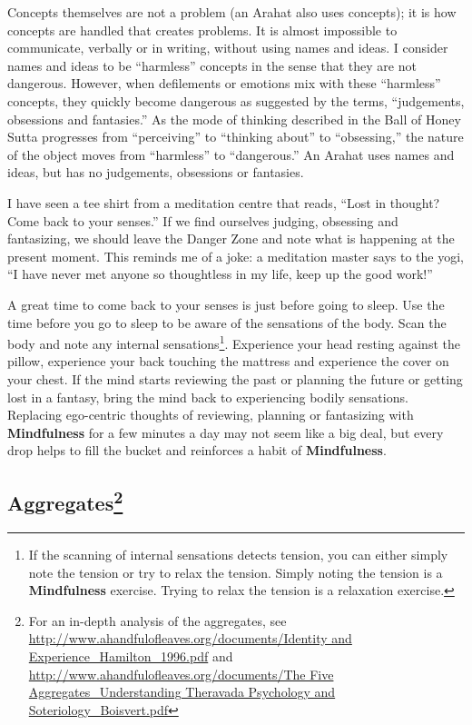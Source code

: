 Concepts themselves are not a problem (an Arahat also uses concepts); it is how concepts are handled that creates problems. It is almost impossible to communicate, verbally or in writing, without using names and ideas. I consider names and ideas to be “harmless” concepts in the sense that they are not dangerous. However, when defilements or emotions mix with these “harmless” concepts, they quickly become dangerous as suggested by the terms, “judgements, obsessions and fantasies.” As the mode of thinking described in the Ball of Honey Sutta progresses from “perceiving” to “thinking about” to “obsessing,” the nature of the object moves from “harmless” to “dangerous.” An Arahat uses names and ideas, but has no judgements, obsessions or fantasies.

I have seen a tee shirt from a meditation centre that reads, “Lost in thought? Come back to your senses.” If we find ourselves judging, obsessing and fantasizing, we should leave the Danger Zone and note what is happening at the present moment. This reminds me of a joke: a meditation master says to the yogi, “I have never met anyone so thoughtless in my life, keep up the good work!”

A great time to come back to your senses is just before going to sleep. Use the time before you go to sleep to be aware of the sensations of the body. Scan the body and note any internal sensations\footnote{If the scanning of internal sensations detects tension, you can either simply note the tension or try to relax the tension. Simply noting the tension is a \textbf{Mindfulness} exercise. Trying to relax the tension is a relaxation exercise.}. Experience your head resting against the pillow, experience your back touching the mattress and experience the cover on your chest. If the mind starts reviewing the past or planning the future or getting lost in a fantasy, bring the mind back to experiencing bodily sensations. Replacing ego-centric thoughts of reviewing, planning or fantasizing with \textbf{Mindfulness} for a few minutes a day may not seem like a big deal, but every drop helps to fill the bucket and reinforces a habit of \textbf{Mindfulness}.

\subsection*{Aggregates\footnote{For an in-depth analysis of the aggregates, see \url{http://www.ahandfulofleaves.org/documents/Identity and Experience_Hamilton_1996.pdf} and \url{http://www.ahandfulofleaves.org/documents/The Five Aggregates_Understanding Theravada Psychology and Soteriology_Boisvert.pdf}}}


